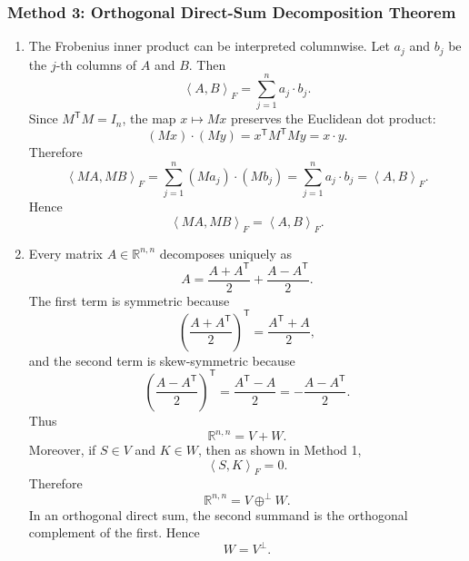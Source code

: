 \documentclass[12pt]{article}
\newcommand{\R}{\mathbb{R}}
\newcommand{\ipF}[2]{\left\langle #1,#2\right\rangle_F}
\newcommand{\T}{\mathsf{T}}
\begin{document}
\subsubsection{Method 3: Orthogonal Direct-Sum Decomposition Theorem}
\begin{enumerate}[label=(\alph*)]
  \item The Frobenius inner product can be interpreted columnwise. Let $a_j$ and $b_j$ be the $j$-th columns of $A$ and $B$. Then
  \[
    \ipF{A}{B}=\sum_{j=1}^n a_j\cdot b_j.
  \]
  Since $M^\T M=I_n$, the map $x\mapsto Mx$ preserves the Euclidean dot product:
  \[
    (Mx)\cdot(My)=x^\T M^\T My=x\cdot y.
  \]
  Therefore
  \[
    \ipF{MA}{MB}
    =\sum_{j=1}^n (Ma_j)\cdot(Mb_j)
    =\sum_{j=1}^n a_j\cdot b_j
    =\ipF{A}{B}.
  \]
  Hence
  \[
    \boxed{\ipF{MA}{MB}=\ipF{A}{B}.}
  \]

  \item Every matrix $A\in\R^{n,n}$ decomposes uniquely as
  \[
    A=\frac{A+A^\T}{2}+\frac{A-A^\T}{2}.
  \]
  The first term is symmetric because
  \[
    \left(\frac{A+A^\T}{2}\right)^\T=\frac{A^\T+A}{2},
  \]
  and the second term is skew-symmetric because
  \[
    \left(\frac{A-A^\T}{2}\right)^\T=\frac{A^\T-A}{2}=-\frac{A-A^\T}{2}.
  \]
  Thus
  \[
    \R^{n,n}=V+W.
  \]
  Moreover, if $S\in V$ and $K\in W$, then as shown in Method 1,
  \[
    \ipF{S}{K}=0.
  \]
  Therefore
  \[
    \R^{n,n}=V\oplus^\perp W.
  \]
  In an orthogonal direct sum, the second summand is the orthogonal complement of the first. Hence
  \[
    \boxed{W=V^\perp.}
  \]
\end{enumerate}

\newpage
\end{document}
